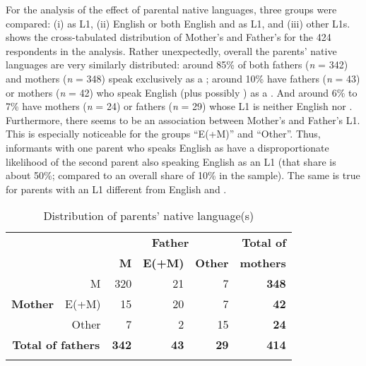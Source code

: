 \documentclass[output=paper]{langsci/langscibook}
\begin{document}
For the analysis of the effect of parental native languages, three groups were compared: (i)  as L1, (ii) English or both English and  as L1, and (iii) other L1s.  shows the cross-tabulated distribution of Mother’s and Father’s  for the 424 respondents in the analysis. Rather unexpectedly, overall the parents’ native languages are very similarly distributed: around 85\% of both fathers (\textit{n} = 342) and mothers (\textit{n} = 348) speak exclusively  as a ; around 10\% have fathers (\textit{n} = 43) or mothers (\textit{n} = 42) who speak English (plus possibly ) as a . And around 6\% to 7\% have mothers (\textit{n} = 24) or fathers (\textit{n} = 29) whose L1 is neither English nor . Furthermore, there seems to be an association between Mother’s and Father’s L1. This is especially noticeable for the groups “E(+M)” and “Other”. Thus, informants with one parent who speaks English as  have a disproportionate likelihood of the second parent also speaking English as an L1 (that share is about 50\%; compared to an overall share of 10\% in the sample). The same is true for parents with an L1 different from English and .

\begin{table}
\caption{Distribution of parents’ native language(s)}
\label{tab:krug:1}

\begin{tabular}{lrrrr@{~~~~~~~~}r}
\lsptoprule
&  & \multicolumn{3}{c}{\bfseries Father} & \bfseries Total of \\
&  & \bfseries M & \bfseries E(+M) & \bfseries Other & \bfseries mothers \\
\midrule 
& M & 320 & 21 & 7 & \textbf{348}\\
\textbf{Mother} & E(+M) & 15 & 20 & 7 & \textbf{42}\\
& Other & 7 & 2 & 15 & \textbf{24}\\
\midrule
\multicolumn{2}{c}{\textbf{Total of fathers}} & \textbf{342} & \textbf{43} & \textbf{29} & \textbf{414}\\
\lspbottomrule
\end{tabular}
\end{table}
\end{document}
